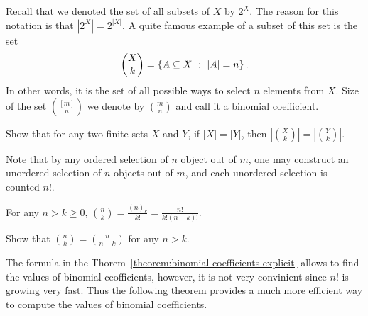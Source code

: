 Recall that we denoted the set of all subsets of $X$ by $2^X$. The reason for
this notation is that $|2^X| = 2^{|X|}$. A quite famous example of a subset of
this set is the set
\[
  \binom{X}{k} = \set[|A| = n]{A \subseteq X}.
\]
In other words, it is the set of all possible ways to select $n$ elements from
$X$. Size of the set $\binom{[m]}{n}$ we denote by $\binom{m}{n}$ and call it a
binomial coefficient.
\begin{exercise}
  Show that for any two finite sets $X$ and $Y$, if $|X| = |Y|$, then
  $\left|\binom{X}{k}\right| = \left|\binom{Y}{k}\right|$.
\end{exercise}

Note that by any ordered selection of $n$ object out of $m$, one may construct
an unordered selection of $n$ objects out of $m$, and each unordered selection
is counted $n!$.
\begin{theorem}
\label{theorem:binomial-coefficients-explicit}
  For any $n > k \ge 0$,
  $\binom{n}{k} = \frac{(n)_k}{k!} = \frac{n!}{k!  (n - k)!}$.
\end{theorem}

\begin{exercise}
  Show that $\binom{n}{k} = \binom{n}{n - k}$ for any $n > k$.
\end{exercise}

The formula in the Thorem~\ref{theorem:binomial-coefficients-explicit} allows
to find the values of binomial ceofficients, however, it is not very convinient
since $n!$ is growing very fast. Thus the following theorem provides a much more
efficient way to compute the values of binomial coefficients.

